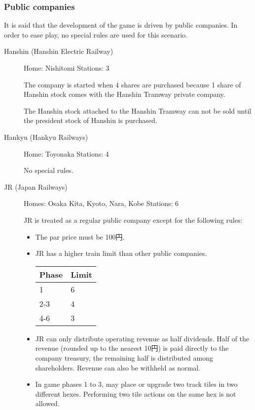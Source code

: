 \documentclass{article}
\begin{document}
\begin{CJK}{UTF8}{min}
\begin{multicols}{2}
\begin{description}
\end{description}

\subsubsection{Public companies}
It is said that the development of the game is driven by public
companies. In order to ease play, no special rules are used for this
scenario.
\begin{description}
\item[Hanshin (Hanshin Electric Railway)] \hfill

  Home: Nishitomi \hfill Stations: 3

  The company is started when 4 shares are purchased because 1 share
  of Hanshin stock comes with the Hanshin Tramway private company.

  The Hanshin stock attached to the Hanshin Tramway can not be sold
  until the president stock of Hanshin is purchased.

\item[Hankyu (Hankyu Railways)] \hfill
Home: Toyonaka \hfill Stations: 4

  No special rules.

\item[JR (Japan Railways)] \hfill
Homes: Osaka Kita, Kyoto, Nara, Kobe \hfill Stations: 6

JR is treated as a regular public company except for the following rules:
\begin{itemize}
\item The par price must be 100円.
\item JR has a higher train limit than other public companies.

\begin{tabular}{ll}
  Phase & Limit \\
  \hline
  1 &  6 \\
  2-3 & 4 \\
  4-6 & 3
\end{tabular}
\item JR can only distribute operating revenue as half dividends. Half
  of the revenue (rounded up to the nearest 10円) is paid directly
  to the company treasury, the remaining half is distributed among
  shareholders. Revenue can also be withheld as normal.
\item In game phases 1 to 3, may place or upgrade two track tiles in
  two different hexes. Performing two tile actions on the same hex is
  not allowed.
\end{itemize}


\end{description}
\end{multicols}
\end{CJK}
\end{document}
